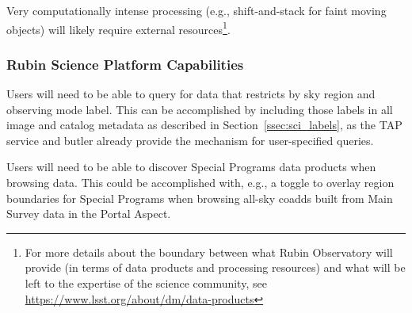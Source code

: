 Very computationally intense processing (e.g., shift-and-stack for faint moving 
objects) will likely require external resources\footnote{For more details about 
the boundary between what Rubin Observatory will provide (in terms of data products 
and processing resources) and what will be left to the expertise of the science community, 
see \url{https://www.lsst.org/about/dm/data-products}}.

\subsubsection{Rubin Science Platform Capabilities}\label{sssec:sci_rsp}

Users will need to be able to query for data that restricts by sky region and 
observing mode label. 
This can be accomplished by including those labels in all image and catalog 
metadata as described in Section~\ref{ssec:sci_labels}, as the TAP service 
and butler already provide the mechanism for user-specified queries.

Users will need to be able to discover Special Programs data products when 
browsing data.
This could be accomplished with, e.g., a toggle to overlay region boundaries
for Special Programs when browsing all-sky coadds built from Main Survey data
in the Portal Aspect.


